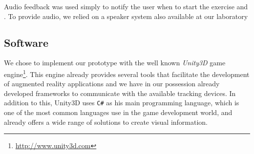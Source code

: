 Audio feedback was used simply to notify the user when to start the exercise and .
To provide audio, we relied on a speaker system also available at our laboratory

\subsection{Software}

We chose to implement our prototype with the well known \emph{Unity3D} game engine\footnote{\url{http://www.unity3d.com}}.
This engine already provides several tools that facilitate the development of augmented reality applications and we have in our possession already developed frameworks to communicate with the available tracking devices. In addition to this, Unity3D uses \texttt{C\#} as his main programming language, which is one of the most common languages use in the game development world, and already offers a wide range of solutions to create visual information.


